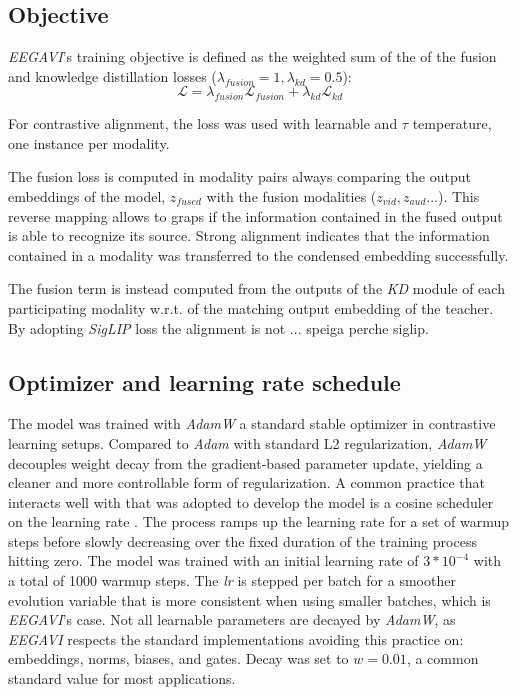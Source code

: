 \subsection{Objective}
\textit{EEGAVI}'s  training objective is defined as the weighted sum of the of the fusion and  knowledge distillation losses ($\lambda_{fusion}=1,\lambda_{kd}=0.5$):
$$ \mathcal{L} = \lambda_{fusion} \mathcal{L}_{fusion}  + \lambda_{kd} \mathcal{L}_{kd}$$


For  contrastive alignment, the  loss was used with learnable  and $\tau$ temperature, one instance per modality.

The fusion loss is computed in modality pairs always comparing the output embeddings of the model, $z_{fused}$ with the fusion modalities ($z_{vid}, z_{aud}$...).
This reverse mapping allows to graps if the information contained in the fused output is able to recognize its source.
Strong alignment indicates that the information contained in a modality was transferred to the condensed embedding successfully.

The  fusion term is instead computed from the outputs of the \textit{KD} module of each participating modality w.r.t. of the matching output embedding of the teacher.
By adopting \textit{SigLIP} loss the alignment is not ... speiga perche siglip.

\subsection{Optimizer and learning rate schedule}
The model was trained with \textit{AdamW} \cite{} a standard stable optimizer in contrastive learning setups.
Compared to \textit{Adam} with standard L2 regularization, \textit{AdamW} decouples weight decay from the gradient-based parameter update, yielding a cleaner and more controllable form of regularization.
A common practice that interacts well with  that was adopted to develop the model is a cosine scheduler on the learning rate \cite{}.
The process ramps up the learning rate for a set of warmup steps before slowly decreasing over the fixed duration of the training process hitting zero.
The model was trained with an initial learning rate of $3*10^{-4}$ with a total of 1000 warmup steps.
The \textit{lr} is stepped per batch for a smoother evolution variable that is more consistent when using smaller batches, which is \textit{EEGAVI}'s case.
Not all learnable parameters are decayed by \textit{AdamW}, as \textit{EEGAVI} respects the standard implementations avoiding this practice on: embeddings, norms, biases, and gates.
Decay was set to $w=0.01$, a common standard value for most applications.


